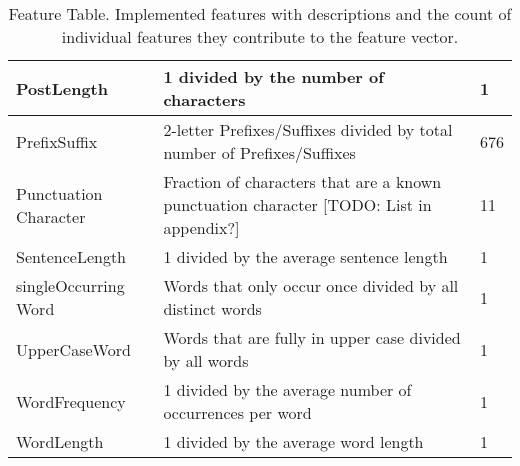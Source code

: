 \begin{table}[h]
\begin{center}
\begin{tabular}{p{2.6cm}|p{8.2cm}|p{1.2cm}}
    PostLength           & 1 divided by the number of characters                                                                                                                                              & 1                 \\ \hline
    PrefixSuffix         & 2-letter Prefixes/Suffixes divided by total number of Prefixes/Suffixes                                                                                                            & 676               \\ \hline
    Punctuation Character & Fraction of characters that are a known punctuation character [TODO: List in appendix?]                                                                                                        & 11                \\ \hline
    SentenceLength       & 1 divided by the average sentence length                                                                                                                                           & 1                 \\ \hline
    singleOccurring Word  & Words that only occur once divided by all distinct words                                                                                                                           & 1                 \\ \hline
    UpperCaseWord        & Words that are fully in upper case divided by all words                                                                                                                            & 1                 \\ \hline
    WordFrequency        & 1 divided by the average number of occurrences per word                                                                                                                            & 1                 \\ \hline
    WordLength           & 1 divided by the average word length                                                                                                                                               & 1                 \\
    \end{tabular}
    \end{center}
	\caption{Feature Table. Implemented features with descriptions and the count of individual features they contribute to the feature vector.}
	\label{tab:featureTable}
\end{table}
